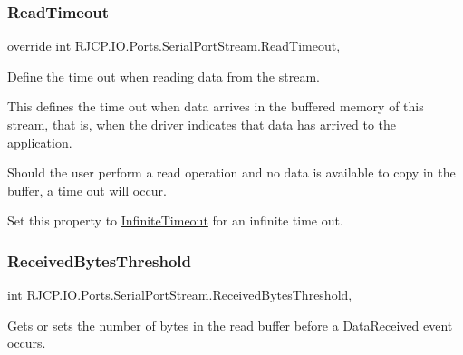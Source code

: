 \subsubsection{\texorpdfstring{ReadTimeout}{ReadTimeout}}
{\footnotesize\ttfamily override int R\+J\+C\+P.\+I\+O.\+Ports.\+Serial\+Port\+Stream.\+Read\+Timeout\hspace{0.3cm}{\ttfamily [get]}, {\ttfamily [set]}}



Define the time out when reading data from the stream. 

This defines the time out when data arrives in the buffered memory of this stream, that is, when the driver indicates that data has arrived to the application. 

Should the user perform a read operation and no data is available to copy in the buffer, a time out will occur.

Set this property to \mbox{\hyperlink{class_r_j_c_p_1_1_i_o_1_1_ports_1_1_serial_port_stream_aa6e7a33a67aa13f5dd0ef9258dc9f6aa}{Infinite\+Timeout}} for an infinite time out.\mbox{\label{class_r_j_c_p_1_1_i_o_1_1_ports_1_1_serial_port_stream_adf0a1fc97efc92a4af67ed2560696188}} 
\subsubsection{\texorpdfstring{ReceivedBytesThreshold}{ReceivedBytesThreshold}}
{\footnotesize\ttfamily int R\+J\+C\+P.\+I\+O.\+Ports.\+Serial\+Port\+Stream.\+Received\+Bytes\+Threshold\hspace{0.3cm}{\ttfamily [get]}, {\ttfamily [set]}}



Gets or sets the number of bytes in the read buffer before a Data\+Received event occurs. 

\mbox{\label{class_r_j_c_p_1_1_i_o_1_1_ports_1_1_serial_port_stream_aadbfc89cfb7940fac498888e691c28e1}} 
